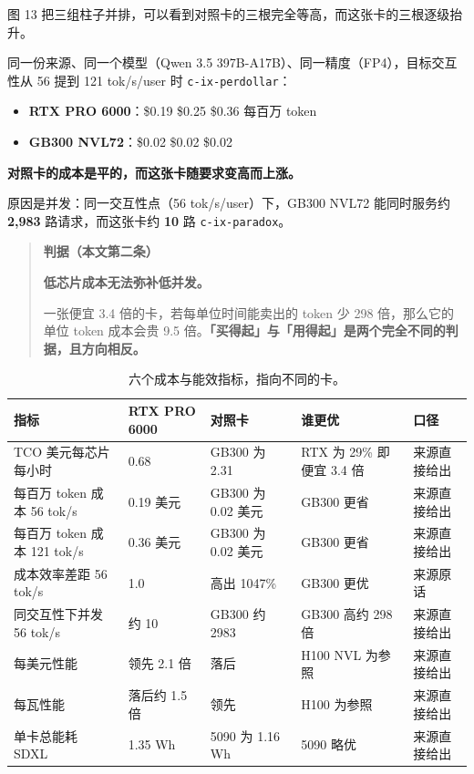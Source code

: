 图 13 把三组柱子并排，可以看到对照卡的三根完全等高，而这张卡的三根逐级抬升。


同一份来源、同一个模型（Qwen 3.5 397B-A17B）、同一精度（FP4），目标交互性从 56 提到 121 tok/s/user 时 {\scriptsize\texttt{c-\hspace{0pt}ix-\hspace{0pt}perdollar}}：


\begin{itemize}
  \item \textbf{RTX PRO 6000}：\$0.19  \$0.25  \$0.36 每百万 token
  \item \textbf{GB300 NVL72}：\$0.02  \$0.02  \$0.02
\end{itemize}

\textbf{对照卡的成本是平的，而这张卡随要求变高而上涨。}


原因是并发：同一交互性点（56 tok/s/user）下，GB300 NVL72 能同时服务约 \textbf{2,983} 路请求，而这张卡约 \textbf{10} 路 {\scriptsize\texttt{c-\hspace{0pt}ix-\hspace{0pt}paradox}}。


\begin{quote}\small
\textbf{ 判据（本文第二条）}

\textbf{低芯片成本无法弥补低并发。}

一张便宜 3.4 倍的卡，若每单位时间能卖出的 token 少 298 倍，那么它的单位 token 成本会贵 9.5 倍。\textbf{「买得起」与「用得起」是两个完全不同的判据，且方向相反。}

\end{quote}

\begin{table}[t]
\centering
\footnotesize
\setlength{\tabcolsep}{4pt}
\caption{六个成本与能效指标，指向不同的卡。}
\label{tab:22}
\begin{tabular}{lllll}
\toprule
指标 & RTX PRO 6000 & 对照卡 & 谁更优 & 口径 \\
\midrule
TCO 美元每芯片每小时 & 0.68 & GB300 为 2.31 & RTX 为 29\% 即便宜 3.4 倍 & 来源直接给出 \\
每百万 token 成本 56 tok/s & 0.19 美元 & GB300 为 0.02 美元 & GB300 更省 & 来源直接给出 \\
每百万 token 成本 121 tok/s & 0.36 美元 & GB300 为 0.02 美元 & GB300 更省 & 来源直接给出 \\
成本效率差距 56 tok/s & 1.0 & 高出 1047\% & GB300 更优 & 来源原话 \\
同交互性下并发 56 tok/s & 约 10 & GB300 约 2983 & GB300 高约 298 倍 & 来源直接给出 \\
每美元性能 & 领先 2.1 倍 & 落后 & H100 NVL 为参照 & 来源直接给出 \\
每瓦性能 & 落后约 1.5 倍 & 领先 & H100 为参照 & 来源直接给出 \\
单卡总能耗 SDXL & 1.35 Wh & 5090 为 1.16 Wh & 5090 略优 & 来源直接给出 \\
\bottomrule
\end{tabular}
\end{table}

